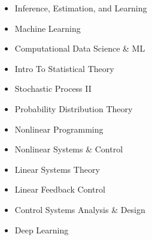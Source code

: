 \documentclass[10pt,a4paper,ragged2e,withhyper]{altacv}
\begin{document}
\makecvheader


    

  

{}
\vspace{-0.5em}
\divider

\vspace{-0.5em}
\divider

\vspace{-0.5em}

\begin{itemize}[itemsep=-2pt, parsep=4pt]
    \item Inference, Estimation, and Learning
    \item Machine Learning
    \item Computational Data Science \& ML
    \item Intro To Statistical Theory
    \item Stochastic Process II
    \item Probability Distribution Theory
    \item Nonlinear Programming
    \item Nonlinear Systems \& Control 
    \item Linear Systems Theory
    \item Linear Feedback Control
    \item Control Systems Analysis \& Design
    \item Deep Learning
\end{itemize}
\end{document}
